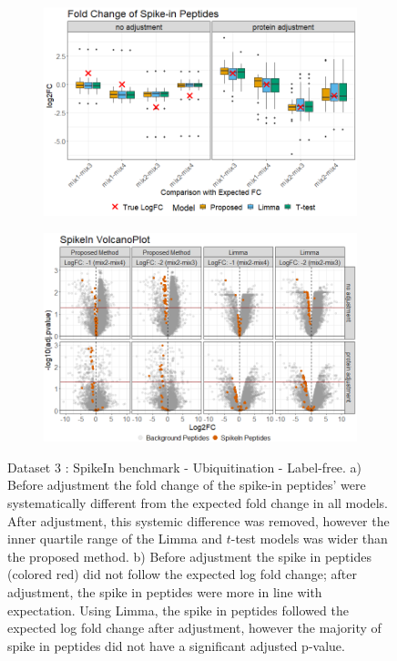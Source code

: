 \documentclass[mcp]{article}
\numberwithin{table}{section}
\begin{document}
\begin{figure}[ht]
\centering
\begin{subfigure}[c]{0.825\linewidth}
\includegraphics[width=1\textwidth]{images/spike_in_fc.png}
\caption{}
\label{fig:spikein_boxplot}
\end{subfigure}
\begin{subfigure}[c]{0.825\linewidth}
\includegraphics[width=1\textwidth]{images/spike_in_volcano.png}
\caption{}
\label{fig:spikein_prop_volcano}
\end{subfigure}
\caption{Dataset 3 : SpikeIn benchmark - Ubiquitination - Label-free. a) Before adjustment the fold change of the spike-in peptides' were systematically different from the expected fold change in all models. After adjustment, this systemic difference was removed, however the inner quartile range of the Limma and $t$-test models was wider than the proposed method. b) Before adjustment the spike in peptides (colored red) did not follow the expected log fold change; after adjustment, the spike in peptides were more in line with expectation. Using Limma, the spike in peptides followed the expected log fold change after adjustment, however the majority of spike in peptides did not have a significant adjusted p-value.}
\label{fig:spikein_volcano}
\end{figure}
\end{document}

